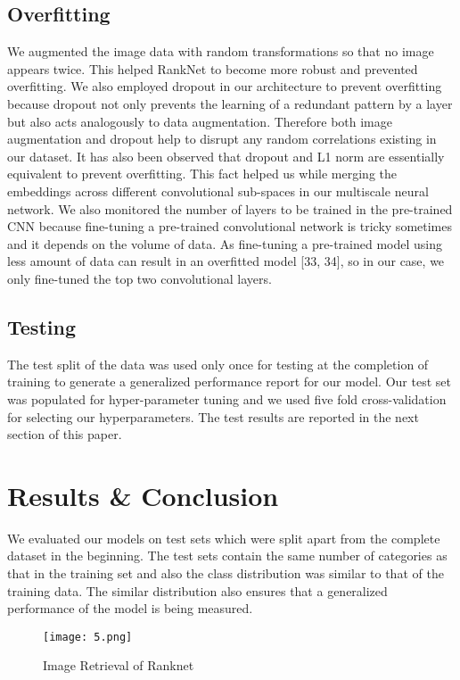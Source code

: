 \documentclass[10pt,twocolumn,letterpaper]{article}
\begin{document}
\subsection{Overfitting}
We augmented the image data with random transformations so that no image appears twice. This helped RankNet to become more robust and prevented overfitting. We also employed dropout in our architecture to prevent overfitting because dropout not only prevents the learning of a redundant pattern by a layer but also acts analogously to data augmentation. Therefore both image augmentation and dropout help to disrupt any random correlations existing in our dataset. It has also been observed that dropout \cite{c30}  and L1 norm \cite{c31} are essentially equivalent to prevent overfitting. This fact helped us while merging the embeddings across different convolutional sub-spaces in our multiscale neural network. We also monitored the number of layers to be trained in the pre-trained CNN because fine-tuning a pre-trained convolutional network is tricky sometimes and it depends on the volume of data. As fine-tuning a pre-trained model using less amount of data can result in an overfitted model [33, 34], so in our case, we only fine-tuned the top two convolutional layers.
\vspace{-1mm}
\subsection{Testing}

The test split of the data was used only once for testing at the completion of training to generate a generalized performance report for our model. Our test set was populated for hyper-parameter tuning and we used five fold cross-validation for selecting our hyperparameters. The test results are reported in the next section of this paper.


\section{Results \& Conclusion}We evaluated our models on test sets which were split apart from the complete dataset in the beginning. The test sets contain the same number of categories as that in the training set and also the class distribution was similar to that of the training data. The similar distribution also ensures that a generalized performance of the model is being measured.

\begin{figure}[htp]
\centering
\texttt{[image: 5.png]}
\caption{Image Retrieval of Ranknet}
\label{fig:captioning}
\end{figure}
\end{document}
